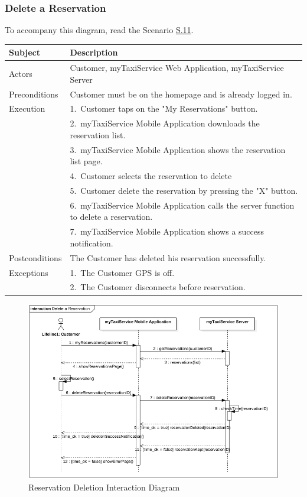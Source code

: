 \subsubsection{Delete a Reservation}
			To accompany this diagram, read the Scenario \hyperref[sec:ReservationDeletionScenario]{S.11}.

				\begin{table}[htpb]
					\centering
					\label{tab:ReservationDeletionTable}
					\begin{tabularx}{\textwidth}{lp{9cm}}
						\hline
						\hline
							\textbf{Subject}
						& 
							\textbf{Description}\\
						\hline
							Actors	       &  Customer, myTaxiService Web Application, myTaxiService Server\\
						\hline
							Preconditions  &  Customer must be on the homepage and is already logged in.\\
						\hline
							Execution      &  1.~Customer taps on the "My Reservations" button.\\
										   &  2.~myTaxiService Mobile Application downloads the reservation list.\\
										   &  3.~myTaxiService Mobile Application shows the reservation list page.\\
										   &  4.~Customer selects the reservation to delete\\
										   &  5.~Customer delete the reservation by pressing the "X" button.\\
										   &  6.~myTaxiService Mobile Application calls the server function to delete a reservation.\\
										   &  7.~myTaxiService Mobile Application shows a success notification.\\
						\hline
							Postconditions &  The Customer has deleted his reservation successfully.\\
						\hline
							Exceptions     &  1.~The Customer GPS is off.\\
							               &  2.~The Customer disconnects before reservation.\\
									
						\hline
						\hline
					\end{tabularx}
				\end{table}
				
				\begin{figure}[H]
					\centering
					\includegraphics[width=\textwidth, scale=0.5]{IMG/InteractionDiagrams/ReservationDeletion.png}
					\caption{Reservation Deletion Interaction Diagram}\label{sec:FigureReservationDeletion}
				\end{figure}